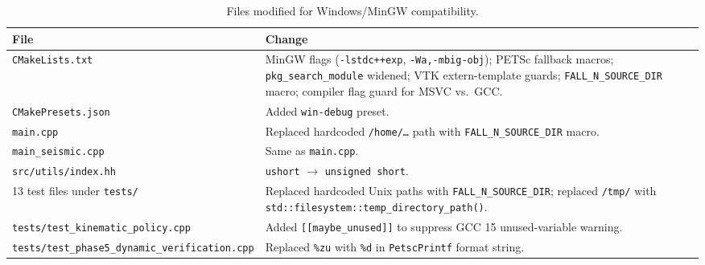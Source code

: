 \begin{table}[ht]
  \centering
  \caption{Files modified for Windows/MinGW compatibility.}
  \label{tab:win-changes}
  \begin{tabular}{p{6.2cm} p{8cm}}
    \toprule
    File & Change \\
    \midrule
    \texttt{CMakeLists.txt}
      & MinGW flags (\texttt{-lstdc++exp},
        \texttt{-Wa,-mbig-obj}); PETSc fallback macros;
        \texttt{pkg\_search\_module} widened; VTK extern-template guards;
        \texttt{FALL\_N\_SOURCE\_DIR} macro; compiler flag guard for MSVC
        vs.\ GCC. \\[3pt]
    \texttt{CMakePresets.json}
      & Added \texttt{win-debug} preset. \\[3pt]
    \texttt{main.cpp}
      & Replaced hardcoded \texttt{/home/\ldots} path with
        \texttt{FALL\_N\_SOURCE\_DIR} macro. \\[3pt]
    \texttt{main\_seismic.cpp}
      & Same as \texttt{main.cpp}. \\[3pt]
    \texttt{src/utils/index.hh}
      & \texttt{ushort} $\to$ \texttt{unsigned short}. \\[3pt]
    13 test files under \texttt{tests/}
      & Replaced hardcoded Unix paths with \texttt{FALL\_N\_SOURCE\_DIR};
        replaced \texttt{/tmp/} with
        \texttt{std::filesystem::temp\_directory\_path()}. \\[3pt]
    \texttt{tests/test\_kinematic\_policy.cpp}
      & Added \texttt{[[maybe\_unused]]} to suppress GCC 15
        unused-variable warning. \\[3pt]
    \texttt{tests/test\_phase5\_dynamic\_verification.cpp}
      & Replaced \texttt{\%zu} with \texttt{\%d} in
        \texttt{PetscPrintf} format string. \\
    \bottomrule
  \end{tabular}
\end{table}
